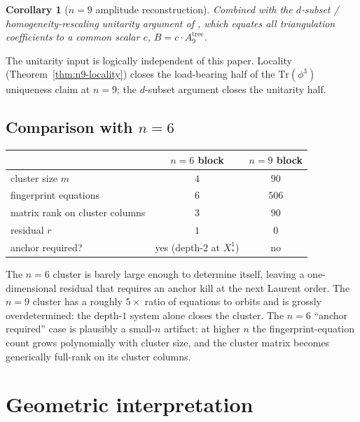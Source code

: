 \documentclass[11pt]{article}
\newtheorem{cor}[thm]{Corollary}
\theoremstyle{definition}
\begin{document}
\begin{cor}[$n=9$ amplitude reconstruction]\label{cor:n9-amp}
Combined with the $d$-subset / homogeneity-rescaling unitarity
argument of \cite{notes11,notes18,subsetvan}, which equates all
triangulation coefficients to a common scalar $c$,
$B=c\cdot A_9^{\mathrm{tree}}$.
\end{cor}

The unitarity input is logically independent of this paper.
Locality (Theorem~\ref{thm:n9-locality}) closes the load-bearing
half of the $\mathrm{Tr}(\phi^3)$ uniqueness claim at $n=9$;
the $d$-subset argument closes the unitarity half.

\subsection{Comparison with $n=6$}\label{subsec:compare}

\begin{center}
\begin{tabular}{lcc}
\toprule
& $n=6$ block & $n=9$ block\\
\midrule
cluster size $m$ & $4$ & $90$\\
fingerprint equations & $6$ & $506$\\
matrix rank on cluster columns & $3$ & $90$\\
residual $r$ & $1$ & $0$\\
anchor required? & yes (depth-$2$ at $X_*^{1}$) & no\\
\bottomrule
\end{tabular}
\end{center}

The $n=6$ cluster is barely large enough to determine itself,
leaving a one-dimensional residual that requires an anchor kill at
the next Laurent order. The $n=9$ cluster has a roughly $5\!\times$
ratio of equations to orbits and is grossly overdetermined: the
depth-$1$ system alone closes the cluster. The $n=6$
``anchor required'' case is plausibly a small-$n$ artifact: at
higher $n$ the fingerprint-equation count grows polynomially with
cluster size, and the cluster matrix becomes generically
full-rank on its cluster columns.

\section{Geometric interpretation}\label{sec:geom}
\end{document}
